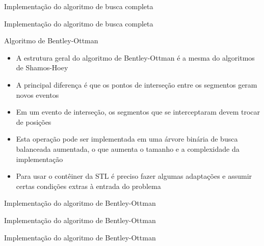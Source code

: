 \begin{frame}[fragile]{Implementação do algoritmo de busca completa}
\end{frame}

\begin{frame}[fragile]{Implementação do algoritmo de busca completa}
\end{frame}

\begin{frame}[fragile]{Algoritmo de Bentley-Ottman}

    \begin{itemize}
        \item A estrutura geral do algoritmo de Bentley-Ottman é a mesma do algoritmos de
            Shamos-Hoey

        \item A principal diferença é que os pontos de interseção entre os segmentos geram
            novos eventos

        \item Em um evento de interseção, os segmentos que se interceptaram devem trocar de
            posições

        \item Esta operação pode ser implementada em uma árvore binária de busca balanceada
            aumentada, o que aumenta o tamanho e a complexidade da implementação

        \item Para usar o contêiner  da STL é preciso fazer algumas adaptações 
            e assumir certas condições extras à entrada do problema
    \end{itemize}

\end{frame}



\begin{frame}[fragile]{Implementação do algoritmo de Bentley-Ottman}
\end{frame}

\begin{frame}[fragile]{Implementação do algoritmo de Bentley-Ottman}
\end{frame}

\begin{frame}[fragile]{Implementação do algoritmo de Bentley-Ottman}
\end{frame}

